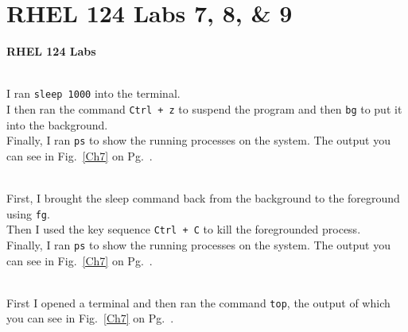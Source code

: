 \documentclass[../CIT217_RHEL124_LabJournal.tex]{subfiles}
\begin{document}

\chapter[RHEL 124 Labs 7, 8, \& 9]{RHEL 124 \linebreak[1] Labs 7, 8, \& 9 \hspace*{\fill}{\date}}
\noindent\textbf{{RHEL 124 Labs} }                             

\\I ran {\scriptsize{\verb$sleep 1000$}\normalsize} into the terminal.
\\I then ran the command {\scriptsize{\verb$Ctrl + z$}\normalsize} to 
suspend the program and then {\scriptsize{\verb$bg$}\normalsize} to
put it into the background. 
\\Finally, I ran {\scriptsize{\verb$ps$}\normalsize} to show the running
processes on the system. The output you can see in
Fig.~\ref{Ch7} on Pg.~\pageref{Ch7}.
\hfill\break

\noindent{}
\\First, I brought the sleep command back from the background to the foreground
using {\scriptsize{\verb$fg$}\normalsize}.
\\Then I used the key sequence {\scriptsize{\verb$Ctrl + C$}\normalsize} to
kill the foregrounded process.
\\Finally, I ran {\scriptsize{\verb$ps$}\normalsize} to show the running
processes on the system. The output you can see in
Fig.~\ref{Ch7} on Pg.~\pageref{Ch7}.
\hfill\break

\noindent{}
\\First I opened a terminal and then ran the command {\scriptsize{\verb$top$}\normalsize}, 
the output of which you can see in Fig.~\ref{Ch7} on Pg.~\pageref{Ch7}.
\end{document}
